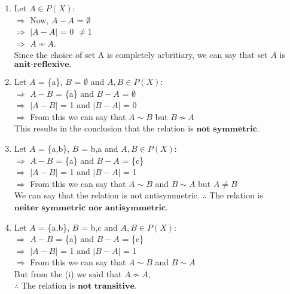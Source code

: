 \documentclass{article}
\begin{document}
\begin{enumerate}
\begin{multicols}{2}
\begin{enumerate}
\begin{enumerate}
            \item Let $A \in P(X)$:\\
                $\Rightarrow$ Now, $A - A$ = $\emptyset$\\
                $\Rightarrow$ $\left\lvert A - A\right\rvert$ = 0 $\neq 1$\\
                $\Rightarrow$ $A \nsim A$.\\
                Since the choice of set A is completely arbritiary, we can say that set $A$ is 
                $\textbf{anit-reflexive.}$\\

            \item Let $A$ = \{a\}, $B$ = $\emptyset$ and $A,B \in P(X)$:\\
                $\Rightarrow$ $A-B$ = \{a\} and $B-A$ = $\emptyset$\\
                $\Rightarrow$ $\left\lvert A - B\right\rvert$ = 1 and $\left\lvert B - A\right\rvert$ = 0\\
                $\Rightarrow$ From this we can say that $A \sim B$ but $B \nsim A$\\
                This results in the conclusion that the relation is $\textbf{not symmetric}$.\\

            \item Let $A$ = \{a,b\}, $B$ = {b,a} and $A,B \in P(X)$:\\
                $\Rightarrow$ $A-B$ = \{a\} and $B-A$ = \{c\} \\
                $\Rightarrow$ $\left\lvert A - B\right\rvert$ = 1 and $\left\lvert B - A\right\rvert$ = 1\\
                $\Rightarrow$ From this we can say that $A \sim B$ and $B \sim A$ but $A \neq B$\\
                We can say that the relation is not antisymmetric. $\therefore$ The relation is 
                $\textbf{neiter symmetric nor antisymmetric}$.\\

            \item Let $A$ = \{a,b\}, $B$ = {b,c} and $A,B \in P(X)$:\\
                $\Rightarrow$ $A-B$ = \{a\} and $B-A$ = \{c\} \\
                $\Rightarrow$ $\left\lvert A - B\right\rvert$ = 1 and $\left\lvert B - A\right\rvert$ = 1\\
                $\Rightarrow$ From this we can say that $A \sim B$ and $B \sim A$\\
                But from the (i) we said that $A \nsim A$,\\ $\therefore$ The relation is $\textbf{not transitive}$.
        \end{enumerate}


\end{enumerate}
\end{multicols}
\end{enumerate}
\end{document}
